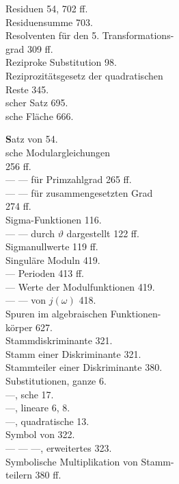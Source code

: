 \begin{minipage}[t]{0.48\textwidth}
\noindent Residuen 54, 702 ff.\\
Residuensumme 703.\\
Resolventen für den 5. Transformations-\\
grad 309 ff.\\
Reziproke Substitution 98.\\
Reziprozitätsgesetz der quadratischen\\
Reste 345.\\
scher Satz 695.\\
sche Fläche 666.

\noindent \textbf{S}atz von  54.\\
sche Modulargleichungen\\
256 ff.\\
--- --- für Primzahlgrad 265 ff.\\
--- --- für zusammengesetzten Grad\\
274 ff.\\
Sigma-Funktionen 116.\\
--- --- durch $\vartheta$ dargestellt 122 ff.\\
Sigmanullwerte 119 ff.\\
Singuläre Moduln 419.\\
--- Perioden 413 ff.\\
--- Werte der Modulfunktionen 419.\\
--- --- von $j(\omega)$ 418.\\
Spuren im algebraischen Funktionen-\\
körper 627.\\
Stammdiskriminante 321.\\
Stamm einer Diskriminante 321.\\
Stammteiler einer Diskriminante 380.\\
Substitutionen, ganze 6.\\
---, sche 17.\\
---, lineare 6, 8.\\
---, quadratische 13.\\
Symbol von  322.\\
--- --- ---, erweitertes 323.\\
Symbolische Multiplikation von Stamm-\\
teilern 380 ff.


\end{minipage}
